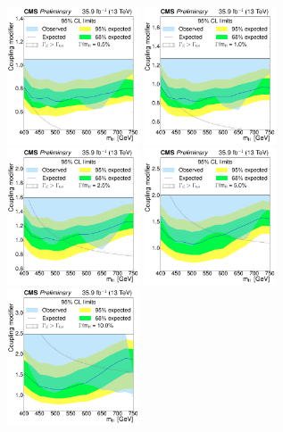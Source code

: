 \begin{figure}[!Hhtb]
\centering
\includegraphics[width=0.35\textwidth,keepaspectratio=true]{fig/chapt8/limits/limit_H_0p5.pdf}
\includegraphics[width=0.35\textwidth,keepaspectratio=true]{fig/chapt8/limits/limit_H_1.pdf}
\includegraphics[width=0.35\textwidth,keepaspectratio=true]{fig/chapt8/limits/limit_H_2p5.pdf}
\includegraphics[width=0.35\textwidth,keepaspectratio=true]{fig/chapt8/limits/limit_H_5.pdf}
\includegraphics[width=0.35\textwidth,keepaspectratio=true]{fig/chapt8/limits/limit_H_10.pdf}

\end{figure}
